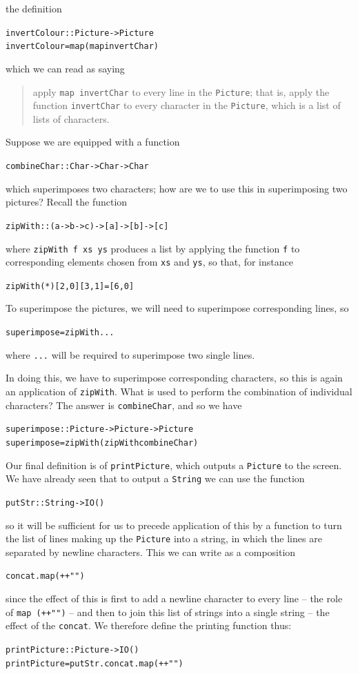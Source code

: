 the definition 
\begin{alltt}
invertColour :: Picture -> Picture
invertColour = map (map invertChar)
\end{alltt}
which we can read as saying
\begin{quote}
apply \texttt{map invertChar} to every line in the \texttt{Picture};
that is, apply the function \texttt{invertChar} to every character in the
\texttt{Picture}, which is a list of lists of characters.
\end{quote}
Suppose we are equipped with a function
\begin{alltt}
combineChar :: Char -> Char -> Char
\end{alltt}
which superimposes two characters; how are we to use this in
superimposing two pictures? Recall the function 
\begin{alltt}
zipWith :: (a -> b -> c) -> [a] -> [b] -> [c]
\end{alltt}
where \texttt{zipWith f xs ys} produces a list by applying the function \texttt{f}
to corresponding elements chosen from \texttt{xs} and \texttt{ys}, so that, for instance
\begin{alltt}
zipWith (*) [2,0] [3,1] = [6,0]
\end{alltt}
To superimpose the pictures, we will need to
superimpose corresponding lines, so
\begin{alltt}
superimpose = zipWith ...
\end{alltt}
where \texttt{...} will be required to superimpose two single lines. 

In doing this, we have to superimpose corresponding
characters, so this is again an application of \texttt{zipWith}. What is
used to perform the combination of individual characters? The answer is 
\texttt{combineChar}, and so we have
\begin{alltt}
superimpose :: Picture -> Picture -> Picture
superimpose = zipWith (zipWith combineChar)
\end{alltt}

Our final definition is of \texttt{printPicture}, which outputs a \texttt{Picture}
to the screen. We have already seen that to output a \texttt{String}
we can use the function
\begin{alltt}
putStr :: String -> IO ()
\end{alltt}
so it will be sufficient for us to precede application of this by a function
to turn the list of lines making up the \texttt{Picture} into a string,
in which the lines are separated by newline characters. This we can write
as a composition
\begin{alltt}
concat . map (++"")
\end{alltt}
since the effect of this is first to add a newline character to every
line -- the role of \texttt{map (++"")} -- and then to join this list of 
strings into a single string -- the effect of the \texttt{concat}. We
therefore define the printing function thus:
\begin{alltt}
printPicture :: Picture -> IO ()
printPicture = putStr . concat . map (++"")
\end{alltt}

